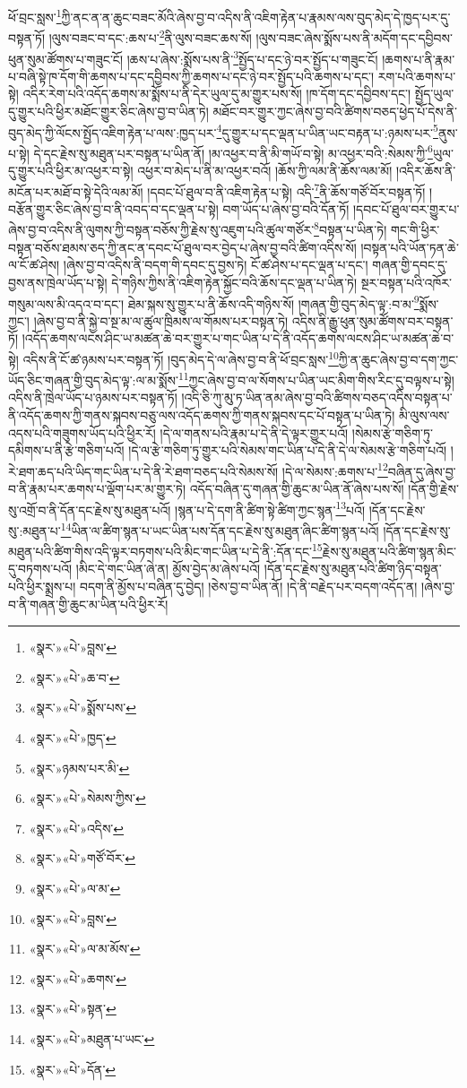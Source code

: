 ཕོ་བྲང་སླས་\footnote{«སྣར་»«པེ་»བླས་}ཀྱི་ནང་ན་ན་ཆུང་བཟང་མོའི་ཞེས་བྱ་བ་འདིས་ནི་འཇིག་རྟེན་པ་རྣམས་ལས་བུད་མེད་དེ་ཁྱད་པར་དུ་བསྟན་ཏོ། །ལུས་བཟང་བ་དང་:ཆས་པ་\footnote{«སྣར་»«པེ་»ཆ་བ་}ནི་ལུས་བཟང་ཆས་སོ། །ལུས་བཟང་ཞེས་སྨོས་པས་ནི་མདོག་དང་དབྱིབས་ཕུན་སུམ་ཚོགས་པ་གཟུང་ངོ། །ཆས་པ་ཞེས་:སྨོས་པས་ནི་\footnote{«སྣར་»«པེ་»སྨོས་པས་}སྤྱོད་པ་དང་ཉེ་བར་སྤྱོད་པ་གཟུང་ངོ། །ཆགས་པ་ནི་རྣམ་པ་བཞི་སྟེ་ཁ་དོག་གི་ཆགས་པ་དང་དབྱིབས་ཀྱི་ཆགས་པ་དང་ཉེ་བར་སྤྱོད་པའི་ཆགས་པ་དང་། རག་པའི་ཆགས་པ་སྟེ། འདིར་རེག་པའི་འདོད་ཆགས་མ་སྨོས་པ་ནི་དེར་ཡུལ་དུ་མ་གྱུར་པས་སོ། །ཁ་དོག་དང་དབྱིབས་དང་། སྤྱོད་ཡུལ་དུ་གྱུར་པའི་ཕྱིར་མཐོང་གྱུར་ཅིང་ཞེས་བྱ་བ་ཡིན་ཏེ། མཐོང་བར་གྱུར་ཀྱང་ཞེས་བྱ་བའི་ཚིགས་བཅད་ཕྱེད་པོ་དེས་ནི་བུད་མེད་ཀྱི་ལོངས་སྤྱོད་འཇིག་རྟེན་པ་ལས་:ཁྱད་པར་\footnote{«སྣར་»«པེ་»ཁྱད་}དུ་གྱུར་པ་དང་ལྡན་པ་ཡིན་ཡང་བརྟན་པ་:ཉམས་པར་\footnote{«སྣར་»ཉམས་པར་མི་}ནུས་པ་སྟེ། དེ་དང་རྗེས་སུ་མཐུན་པར་བསྟན་པ་ཡིན་ནོ། །མ་འཕྱར་བ་ནི་མི་གཡོ་བ་སྟེ། མ་འཕྱར་བའི་:སེམས་ཀྱི་\footnote{«སྣར་»«པེ་»སེམས་ཀྱིས་}ཡུལ་དུ་གྱུར་པའི་ཕྱིར་མ་འཕྱར་བ་སྟེ། འཕྱར་བ་མེད་པ་ནི་མ་འཕྱར་བའོ། །ཆོས་ཀྱི་ལམ་ནི་ཆོས་ལམ་མོ། །འདིར་ཆོས་ནི་མངོན་པར་མཐོ་བ་སྟེ་དེའི་ལམ་མོ། །དབང་པོ་ཐུལ་བ་ནི་འཇིག་རྟེན་པ་སྟེ། འདི་\footnote{«སྣར་»«པེ་»འདིས་}ནི་ཆོས་གཙོ་བོར་བསྟན་ཏོ། །བརྩོན་གྱུར་ཅིང་ཞེས་བྱ་བ་ནི་འབད་བ་དང་ལྡན་པ་སྟེ། བག་ཡོད་པ་ཞེས་བྱ་བའི་དོན་ཏོ། །དབང་པོ་ཐུལ་བར་གྱུར་པ་ཞེས་བྱ་བ་འདིས་ནི་ལུགས་ཀྱི་བསྟན་བཅོས་ཀྱི་རྗེས་སུ་འཇུག་པའི་ཚུལ་གཙོར་\footnote{«སྣར་»«པེ་»གཙོ་བོར་}བསྟན་པ་ཡིན་ཏེ། གང་གི་ཕྱིར་བསྟན་བཅོས་ཐམས་ཅད་ཀྱི་ནང་ན་དབང་པོ་ཐུལ་བར་བྱེད་པ་ཞེས་བྱ་བའི་ཚིག་འདིས་སོ། །བསྟན་པའི་ཡོན་ཏན་ཆེ་ལ་ངོ་ཚ་ཤེས། །ཞེས་བྱ་བ་འདིས་ནི་བདག་གི་དབང་དུ་བྱས་ཏེ། ངོ་ཚ་ཤེས་པ་དང་ལྡན་པ་དང་། གཞན་གྱི་དབང་དུ་བྱས་ནས་ཁྲེལ་ཡོད་པ་སྟེ། དེ་གཉིས་ཀྱིས་ནི་འཇིག་རྟེན་སྐྱོང་བའི་ཆོས་དང་ལྡན་པ་ཡིན་ཏེ། སྔར་བསྟན་པའི་འཁོར་གསུམ་ལས་མི་འདའ་བ་དང་། ཐེམ་སྐས་སུ་གྱུར་པ་ནི་ཆོས་འདི་གཉིས་སོ། །གཞན་གྱི་བུད་མེད་ལྟ་:བ་མ་\footnote{«སྣར་»«པེ་»ལ་མ་}སྨོས་ཀྱང་། །ཞེས་བྱ་བ་ནི་སྐྱེ་བ་སྔ་མ་ལ་ཚུལ་ཁྲིམས་ལ་གོམས་པར་བསྟན་ཏེ། འདིས་ནི་རྒྱུ་ཕུན་སུམ་ཚོགས་བར་བསྟན་ཏོ། །འདོད་ཆགས་ལངས་ཤིང་ཡ་མཚན་ཆེ་བར་གྱུར་པ་གང་ཡིན་པ་དེ་ནི་འདོད་ཆགས་ལངས་ཤིང་ཡ་མཚན་ཆེ་བ་སྟེ། འདིས་ནི་ངོ་ཚ་ཉམས་པར་བསྟན་ཏོ། །བུད་མེད་དེ་ལ་ཞེས་བྱ་བ་ནི་ཕོ་བྲང་སླས་\footnote{«སྣར་»«པེ་»བླས་}ཀྱི་ན་ཆུང་ཞེས་བྱ་བ་དག་ཀྱང་ཡོད་ཅིང་གཞན་གྱི་བུད་མེད་ལྟ་:ལ་མ་སྨོས་\footnote{«སྣར་»«པེ་»ལ་མ་མོས་}ཀྱང་ཞེས་བྱ་བ་ལ་སོགས་པ་ཡིན་ཡང་མིག་གིས་རིང་དུ་བལྟས་པ་སྟེ། འདིས་ནི་ཁྲེལ་ཡོད་པ་ཉམས་པར་བསྟན་ཏོ། །འདི་ཅི་ཀུ་མུ་ཏ་ཡིན་ནམ་ཞེས་བྱ་བའི་ཚིགས་བཅད་འདིས་བསྟན་པ་ནི་འདོད་ཆགས་ཀྱི་གནས་སྐབས་བཅུ་ལས་འདོད་ཆགས་ཀྱི་གནས་སྐབས་དང་པོ་བསྟན་པ་ཡིན་ཏེ། མི་ལུས་ལས་འདས་པའི་གཟུགས་ཡོད་པའི་ཕྱིར་རོ། །དེ་ལ་གནས་པའི་རྣམ་པ་དེ་ནི་དེ་ལྟར་གྱུར་པའོ། །སེམས་རྩེ་གཅིག་ཏུ་དམིགས་པ་ནི་རྩེ་གཅིག་པའོ། །དེ་ལ་རྩེ་གཅིག་ཏུ་གྱུར་པའི་སེམས་གང་ཡིན་པ་དེ་ནི་དེ་ལ་སེམས་རྩེ་གཅིག་པའོ། །རེ་ཐག་ཆད་པའི་ཡིད་གང་ཡིན་པ་དེ་ནི་རེ་ཐག་བཅད་པའི་སེམས་སོ། །དེ་ལ་སེམས་:ཆགས་པ་\footnote{«སྣར་»«པེ་»ཆགས་}བཞིན་དུ་ཞེས་བྱ་བ་ནི་རྣམ་པར་ཆགས་པ་ལྡོག་པར་མ་གྱུར་ཏེ། འདོད་བཞིན་དུ་གཞན་གྱི་ཆུང་མ་ཡིན་ནོ་ཞེས་པས་སོ། །དོན་གྱི་རྗེས་སུ་འགྲོ་བ་ནི་དོན་དང་རྗེས་སུ་མཐུན་པའོ། །སྙན་པ་དེ་དག་ནི་ཚིག་སྟེ་ཚིག་ཀྱང་སྙན་\footnote{«སྣར་»«པེ་»སྟན་}པའོ། །དོན་དང་རྗེས་སུ་:མཐུན་པ་\footnote{«སྣར་»«པེ་»མཐུན་པ་ཡང་}ཡིན་ལ་ཚིག་སྙན་པ་ཡང་ཡིན་པས་དོན་དང་རྗེས་སུ་མཐུན་ཞིང་ཚིག་སྙན་པའོ། །དོན་དང་རྗེས་སུ་མཐུན་པའི་ཚིག་གིས་འདི་ལྟར་བཏགས་པའི་མིང་གང་ཡིན་པ་དེ་ནི་:དོན་དང་\footnote{«སྣར་»«པེ་»དོན་}རྗེས་སུ་མཐུན་པའི་ཚིག་སྙན་མིང་དུ་བཏགས་པའོ། །མིང་དེ་གང་ཡིན་ཞེ་ན། མྱོས་བྱེད་མ་ཞེས་པའོ། །དོན་དང་རྗེས་སུ་མཐུན་པའི་ཚིག་ཉིད་བསྟན་པའི་ཕྱིར་སྨྲས་པ། བདག་ནི་མྱོས་པ་བཞིན་དུ་བྱེད། །ཅེས་བྱ་བ་ཡིན་ནོ། །དེ་ནི་བརྗེད་པར་བདག་འདོད་ན། །ཞེས་བྱ་བ་ནི་གཞན་གྱི་ཆུང་མ་ཡིན་པའི་ཕྱིར་རོ། 